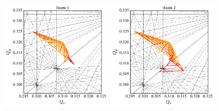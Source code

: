 \documentclass{cernatsnote}
\begin{document}
\begin{figure}[h!]
\centering
\includegraphics[width=0.49\textwidth]{images/footprint_b1_base_optim.pdf} \hfill \includegraphics[width=0.49\textwidth]{images/footprint_b2_base_optim.pdf} \\
\caption{\label{footprint_optim} }
\end{figure}
\end{document}
